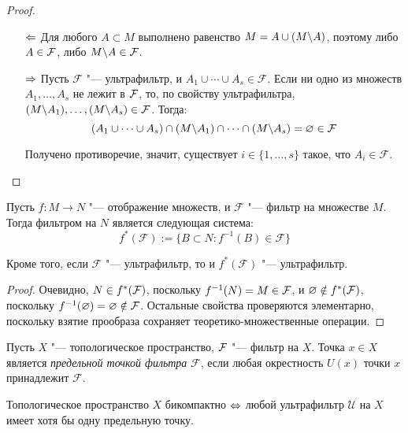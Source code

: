 \begin{proof}~
    \begin{itemize}
        \item[$\Leftarrow$] Для любого $A \subset M$ выполнено равенство $M = A \cup (M \backslash A)$, поэтому либо $A \in \mathcal F$, либо $M \backslash A \in \mathcal F$.

        \item[$\Rightarrow$] Пусть $\mathcal{F}$ "--- ультрафильтр, и $A_1 \cup \dotsb \cup A_s \in\mathcal{F}$. Если ни одно из множеств $A_1, \dotsc, A_s$ не лежит в $\mathcal F$, то, по свойству ультрафильтра, $(M \backslash A_1), \dotsc, (M \backslash A_s) \in \mathcal F$. Тогда:
        \[(A_1 \cup \dotsb \cup A_s) \cap (M \backslash A_1) \cap \dotsb \cap (M \backslash A_s) = \varnothing \in \mathcal F\]

        Получено противоречие, значит, существует $i \in \{1, \dotsc, s\}$ такое, что $A_i \in \mathcal{F}$.\qedhere
    \end{itemize}
\end{proof}

\begin{proposition}\label{randomprop}
    Пусть $f: M \rightarrow N$ "--- отображение множеств, и $\mathcal{F}$ "--- фильтр на множестве $M$. Тогда фильтром на $N$ является следующая система:
    \[f^*(\mathcal{F}) := \lbrace B \subset N : f^{-1}(B)\in\mathcal{F}\rbrace\]

    Кроме того, если $\mathcal{F}$ "--- ультрафильтр, то и $f^*(\mathcal{F})$ "--- ультрафильтр.
\end{proposition}

\begin{proof}
    Очевидно, $N \in f^*(\mathcal F)$, поскольку $f^{-1}(N) = M \in \mathcal F$, и $\varnothing \notin f^*(\mathcal F)$, поскольку $f^{-1}(\varnothing) = \varnothing \notin \mathcal F$. Остальные свойства проверяются элементарно, поскольку взятие прообраза сохраняет теоретико-множественные операции.
\end{proof}

\begin{definition}
    Пусть $X$ "--- топологическое пространство, $\mathcal F$ "--- фильтр на $X$. Точка $x \in X$ является \textit{предельной точкой фильтра} $\mathcal{F}$, если любая окрестность $U(x)$ точки $x$ принадлежит $\mathcal{F}$.
\end{definition}

\begin{proposition}
    Топологическое пространство $X$ бикомпактно $\Leftrightarrow$ любой ультрафильтр $\mathcal{U}$ на $X$ имеет хотя бы одну предельную точку.
\end{proposition}

